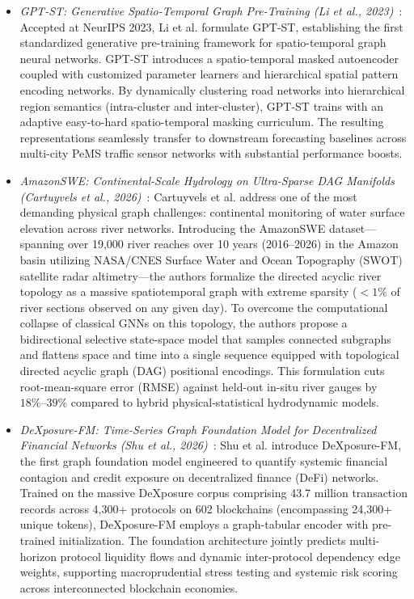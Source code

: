 \begin{itemize}[leftmargin=*]
    \item \emph{GPT-ST: Generative Spatio-Temporal Graph Pre-Training (Li et al., 2023)}~\cite{li2023gptst}: Accepted at NeurIPS 2023, Li et al. formulate GPT-ST, establishing the first standardized generative pre-training framework for spatio-temporal graph neural networks. GPT-ST introduces a spatio-temporal masked autoencoder coupled with customized parameter learners and hierarchical spatial pattern encoding networks. By dynamically clustering road networks into hierarchical region semantics (intra-cluster and inter-cluster), GPT-ST trains with an adaptive easy-to-hard spatio-temporal masking curriculum. The resulting representations seamlessly transfer to downstream forecasting baselines across multi-city PeMS traffic sensor networks with substantial performance boosts.
    \item \emph{AmazonSWE: Continental-Scale Hydrology on Ultra-Sparse DAG Manifolds (Cartuyvels et al., 2026)}~\cite{cartuyvels2026hydrology}: Cartuyvels et al. address one of the most demanding physical graph challenges: continental monitoring of water surface elevation across river networks. Introducing the AmazonSWE dataset—spanning over 19,000 river reaches over 10 years (2016--2026) in the Amazon basin utilizing NASA/CNES Surface Water and Ocean Topography (SWOT) satellite radar altimetry—the authors formalize the directed acyclic river topology as a massive spatiotemporal graph with extreme sparsity ($<1\%$ of river sections observed on any given day). To overcome the computational collapse of classical GNNs on this topology, the authors propose a bidirectional selective state-space model that samples connected subgraphs and flattens space and time into a single sequence equipped with topological directed acyclic graph (DAG) positional encodings. This formulation cuts root-mean-square error (RMSE) against held-out in-situ river gauges by $18\%\text{--}39\%$ compared to hybrid physical-statistical hydrodynamic models.
    \item \emph{DeXposure-FM: Time-Series Graph Foundation Model for Decentralized Financial Networks (Shu et al., 2026)}~\cite{shu2026dexposure}: Shu et al. introduce DeXposure-FM, the first graph foundation model engineered to quantify systemic financial contagion and credit exposure on decentralized finance (DeFi) networks. Trained on the massive DeXposure corpus comprising 43.7 million transaction records across 4,300+ protocols on 602 blockchains (encompassing 24,300+ unique tokens), DeXposure-FM employs a graph-tabular encoder with pre-trained initialization. The foundation architecture jointly predicts multi-horizon protocol liquidity flows and dynamic inter-protocol dependency edge weights, supporting macroprudential stress testing and systemic risk scoring across interconnected blockchain economies.

\end{itemize}
